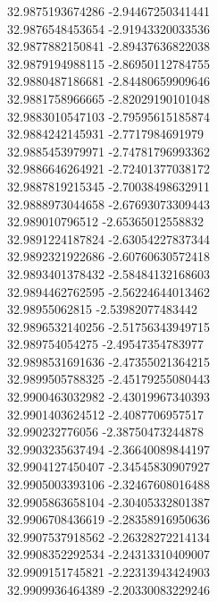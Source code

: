 {32.9875193674286	-2.94467250341441\\
32.9876548453654	-2.91943320033536\\
32.9877882150841	-2.89437636822038\\
32.9879194988115	-2.86950112784755\\
32.9880487186681	-2.84480659909646\\
32.9881758966665	-2.82029190101048\\
32.9883010547103	-2.79595615185874\\
32.9884242145931	-2.7717984691979\\
32.9885453979971	-2.74781796993362\\
32.9886646264921	-2.72401377038172\\
32.9887819215345	-2.70038498632911\\
32.9888973044658	-2.67693073309443\\
32.989010796512	-2.65365012558832\\
32.9891224187824	-2.63054227837344\\
32.9892321922686	-2.60760630572418\\
32.9893401378432	-2.58484132168603\\
32.9894462762595	-2.56224644013462\\
32.98955062815	-2.53982077483442\\
32.9896532140256	-2.51756343949715\\
32.989754054275	-2.49547354783977\\
32.9898531691636	-2.47355021364215\\
32.9899505788325	-2.45179255080443\\
32.9900463032982	-2.43019967340393\\
32.9901403624512	-2.4087706957517\\
32.990232776056	-2.38750473244878\\
32.9903235637494	-2.36640089844197\\
32.9904127450407	-2.34545830907927\\
32.9905003393106	-2.32467608016488\\
32.9905863658104	-2.30405332801387\\
32.9906708436619	-2.28358916950636\\
32.9907537918562	-2.26328272214134\\
32.9908352292534	-2.24313310409007\\
32.9909151745821	-2.22313943424903\\
32.9909936464389	-2.20330083229246\\
}

